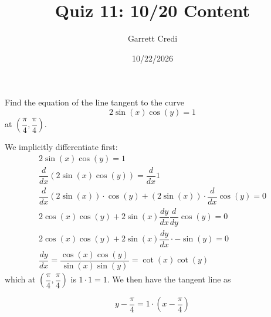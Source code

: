 \documentclass[addpoints,12pt]{exam}
\title{Quiz 11: 10/20 Content}
\author{Garrett Credi}
\date{10/22/2026}
\begin{document}
\maketitle

\newpage

\begin{questions}
  \question[5] Find the equation of the line tangent to the curve
  \begin{equation}
    2 \sin(x) \cos(y) = 1
  \end{equation}
  at $(\dfrac{\pi}{4}, \dfrac{\pi}{4})$.

  \begin{solution}
    We implicitly differentiate first:
    \begin{gather}
      2 \sin(x) \cos(y) = 1 \\
      \dfrac{d}{dx} (2 \sin(x) \cos(y)) = \dfrac{d}{dx} 1 \\
      \dfrac{d}{dx} (2 \sin(x)) \cdot \cos(y) + (2 \sin(x)) \cdot \dfrac{d}{dx} \cos(y) = 0 \\
      2 \cos(x) \cos(y) + 2 \sin(x) \dfrac{dy}{dx} \dfrac{d}{dy} \cos(y) = 0 \\
      2 \cos(x)\cos(y) + 2 \sin(x) \dfrac{dy}{dx} \cdot - \sin(y) = 0 \\
      \dfrac{dy}{dx} = \dfrac{\cos(x) \cos(y)}{\sin(x)\sin(y)} = \cot(x) \cot(y)
    \end{gather}
    which at $(\dfrac{\pi}{4}, \dfrac{\pi}{4})$ is $1 \cdot 1 = 1$.
    We then have the tangent line as

    \begin{equation}
      y - \dfrac{\pi}{4} = 1 \cdot (x - \dfrac{\pi}{4})
    \end{equation}
  \end{solution}
\end{questions}
\end{document}
